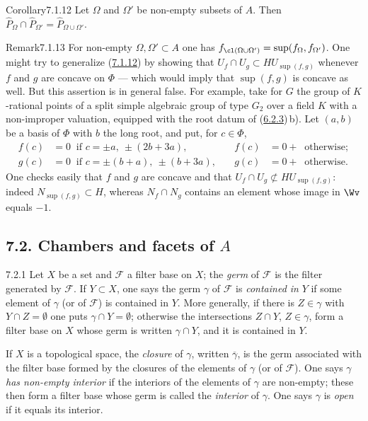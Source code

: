 \documentclass[12pt,a4paper,oneside,english]{smfart}
\makeatletter
\newcommand{\btanchor}[1]{\leavevmode\Hy@raisedlink{\hypertarget{bt:#1}{}}}
\newcommand{\btref}[1]{\hyperlink{bt:#1}{#1}}
\newcommand{\btsecB}[2]{%
  \par\needspace{4\baselineskip}\phantomsection
  \subsection*{#2}%
  \ifx\relax#1\relax\else\btanchor{#1}\fi}
\theoremstyle{definition}
\theoremstyle{bt}
\makeatother
\begin{document}
\begin{bt}{Corollary}{7.1.12}\btanchor{7.1.12}
Let $\Omega$ and $\Omega'$ be non-empty subsets of $A$. Then
$\widehat{P}_\Omega\cap\widehat{P}_{\Omega'}=\widehat{P}_{\Omega\cup\Omega'}$.
\end{bt}

\begin{bt}{Remark}{7.1.13}\btanchor{7.1.13}
For non-empty $\Omega,\Omega'\subset A$ one has
$f_{\cl(\Omega\cup\Omega')}=\sup(f_\Omega,f_{\Omega'})$. One might try to
generalize (\btref{7.1.12}) by showing that $U_f\cap U_g\subset HU_{\sup(f,g)}$
whenever $f$ and $g$ are concave on $\Phi$ --- which would imply that
$\sup(f,g)$ is concave as well. But this assertion is in general false.
For example, take for $G$ the group of $K$-rational points of a split
simple algebraic group of type $G_2$ over a field $K$ with a
non-improper valuation, equipped with the root datum of
(\btref{6.2.3})\,b). Let $(a,b)$ be a basis of $\Phi$ with $b$ the long root, and
put, for $c\in\Phi$,
\[
\begin{aligned}
  f(c)&=0 \ \text{ if } c=\pm a,\ \pm(2b+3a), &\quad f(c)&=0+ \ \text{ otherwise};\\
  g(c)&=0 \ \text{ if } c=\pm(b+a),\ \pm(b+3a), &\quad g(c)&=0+ \ \text{ otherwise}.
\end{aligned}
\]
One checks easily that $f$ and $g$ are concave and that
$U_f\cap U_g\not\subset HU_{\sup(f,g)}$: indeed
$N_{\sup(f,g)}\subset H$, whereas $N_f\cap N_g$ contains an element whose
image in $\Wv$ equals $-1$.
\end{bt}


\btsecB{7.2}{7.2. Chambers and facets of \texorpdfstring{$A$}{A}}


\begin{btpar}{7.2.1}
Let $X$ be a set and $\mathscr{F}$ a filter base on $X$; the
\emph{germ} of $\mathscr{F}$ is the filter generated by $\mathscr{F}$.
If $Y\subset X$, one says the germ $\gamma$ of $\mathscr{F}$ is
\emph{contained in} $Y$ if some element of $\gamma$ (or of
$\mathscr{F}$) is contained in $Y$. More generally, if there is
$Z\in\gamma$ with $Y\cap Z=\emptyset$ one puts $\gamma\cap Y=\emptyset$;
otherwise the intersections $Z\cap Y$, $Z\in\gamma$, form a filter base
on $X$ whose germ is written $\gamma\cap Y$, and it is contained in $Y$.

If $X$ is a topological space, the \emph{closure} of $\gamma$, written
$\overline{\gamma}$, is the germ associated with the filter base formed
by the closures of the elements of $\gamma$ (or of $\mathscr{F}$). One
says $\gamma$ \emph{has non-empty interior} if the interiors of the
elements of $\gamma$ are non-empty; these then form a filter base whose
germ is called the \emph{interior} of $\gamma$. One says $\gamma$ is
\emph{open} if it equals its interior.
\end{btpar}
\end{document}
